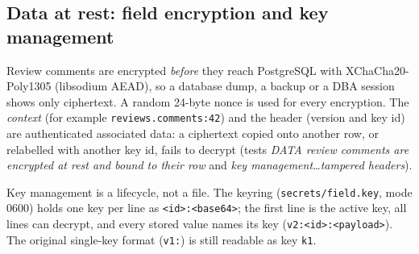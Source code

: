 \documentclass[10pt,a4paper]{article}
\newcommand{\code}[1]{\nolinkurl{#1}}
\begin{document}
\subsection{Data at rest: field encryption and key management}
Review comments are encrypted \emph{before} they reach PostgreSQL with XChaCha20-Poly1305 (libsodium AEAD), so a database dump, a backup or a DBA session shows only ciphertext. A random 24-byte nonce is used for every encryption. The \emph{context} (for example \code{reviews.comments:42}) and the header (version and key id) are authenticated associated data: a ciphertext copied onto another row, or relabelled with another key id, fails to decrypt (tests \emph{DATA review comments are encrypted at rest and bound to their row} and \emph{key management\ldots tampered headers}).

Key management is a lifecycle, not a file. The keyring (\code{secrets/field.key}, mode 0600) holds one key per line as \code{<id>:<base64>}; the first line is the active key, all lines can decrypt, and every stored value names its key (\code{v2:<id>:<payload>}). The original single-key format (\code{v1:}) is still readable as key \code{k1}.
\end{document}
